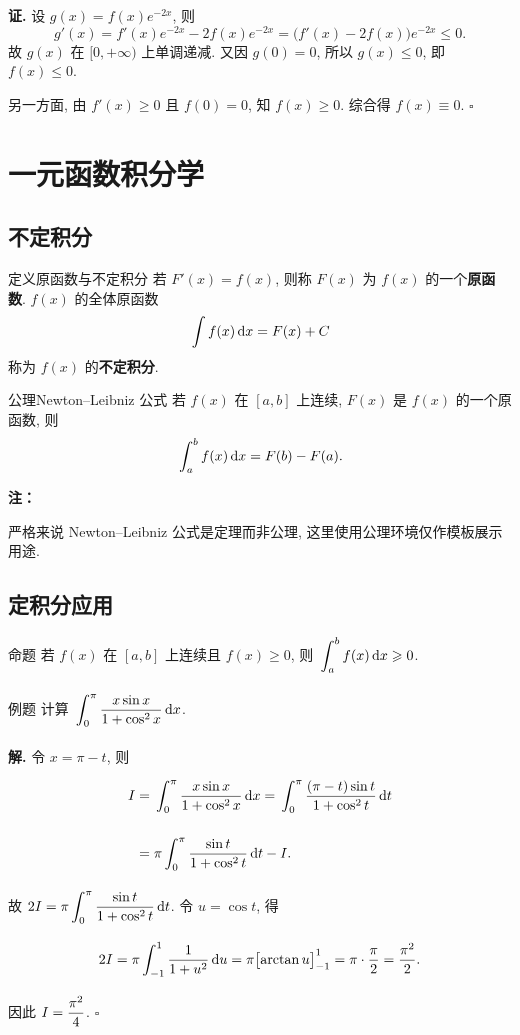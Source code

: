 \documentclass[a4paper,12pt,oneside,fontset=none]{ctexbook}
\renewcommand{\ge}{\geqslant}
\renewcommand{\le}{\leqslant}
\let\olddfrac\dfrac
\renewcommand{\dfrac}[2]{
    \olddfrac{#1\vrule width 0pt height 1.15em depth 0em}{#2\vrule width 0pt height 0em depth 0.6em}
}
\let\oldint\int
\renewcommand{\int}{\displaystyle{\vrule width 0pt height 0em depth 0em}\oldint}
\newenvironment{proposition}[1][]{\begin{thmBox}{命题}{#1}}{\end{thmBox}}
\newcounter{definition}[chapter]
\newenvironment{definition}[1][]{\begin{defBox}{定义}{#1}}{\end{defBox}}
\newenvironment{axiom}[1][]{\begin{defBox}{公理}{#1}}{\end{defBox}}
\newcounter{example}[chapter]
\newenvironment{example}[1][]{\begin{exBox}{例题}{#1}}{\end{exBox}}
\newenvironment{note}{
    \par\vspace{0.5em}\noindent
    \textbf{\color{NoteColor} 注：}
}{
    \par\vspace{0.5em}
}
\numberwithin{equation}{chapter}
\begin{document}
\textbf{证.} 设 $g(x) = f(x)e^{-2x}$, 则
\[
    g'(x) = f'(x)e^{-2x} - 2f(x)e^{-2x} = \bigl(f'(x) - 2f(x)\bigr)e^{-2x} \le 0.
\]
故 $g(x)$ 在 $[0, +\infty)$ 上单调递减. 又因 $g(0) = 0$, 所以 $g(x) \le 0$, 即 $f(x) \le 0$.

另一方面, 由 $f'(x) \ge 0$ 且 $f(0) = 0$, 知 $f(x) \ge 0$. 综合得 $f(x) \equiv 0$. \hfill $\square$

\chapter{一元函数积分学}

\section{不定积分}

\begin{definition}[原函数与不定积分]
若 $F'(x) = f(x)$, 则称 $F(x)$ 为 $f(x)$ 的一个\textbf{原函数}. $f(x)$ 的全体原函数
\[
    \int f(x)\,\mathrm{d}x = F(x) + C
\]
称为 $f(x)$ 的\textbf{不定积分}.
\end{definition}

\begin{axiom}[Newton--Leibniz 公式]
若 $f(x)$ 在 $[a, b]$ 上连续, $F(x)$ 是 $f(x)$ 的一个原函数, 则
\[
    \int_a^b f(x)\,\mathrm{d}x = F(b) - F(a).
\]
\end{axiom}

\begin{note}
严格来说 Newton--Leibniz 公式是定理而非公理, 这里使用公理环境仅作模板展示用途.
\end{note}

\section{定积分应用}

\begin{proposition}
若 $f(x)$ 在 $[a, b]$ 上连续且 $f(x) \ge 0$, 则 $\int_a^b f(x)\,\mathrm{d}x \ge 0$.
\end{proposition}

\begin{example}
计算 $\int_0^{\pi} \dfrac{x\sin x}{1 + \cos^2 x}\,\mathrm{d}x$.
\end{example}

\textbf{解.} 令 $x = \pi - t$, 则
\begin{align*}
    I &= \int_0^{\pi} \dfrac{x\sin x}{1 + \cos^2 x}\,\mathrm{d}x 
     = \int_0^{\pi} \dfrac{(\pi - t)\sin t}{1 + \cos^2 t}\,\mathrm{d}t \\[6pt]
      &= \pi\int_0^{\pi}\dfrac{\sin t}{1 + \cos^2 t}\,\mathrm{d}t - I.
\end{align*}
故 $2I = \pi\int_0^{\pi}\dfrac{\sin t}{1 + \cos^2 t}\,\mathrm{d}t$. 令 $u = \cos t$, 得
\[
    2I = \pi\int_{-1}^{1}\dfrac{1}{1 + u^2}\,\mathrm{d}u = \pi\bigl[\arctan u\bigr]_{-1}^{1} = \pi\cdot\dfrac{\pi}{2} = \dfrac{\pi^2}{2}.
\]
因此 $I = \dfrac{\pi^2}{4}$. \hfill $\square$
\end{document}
